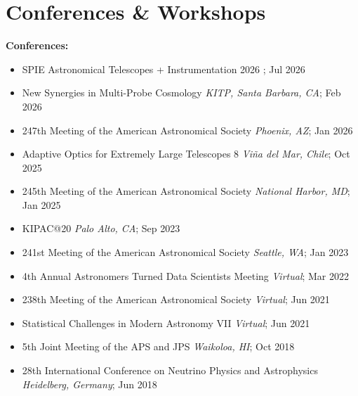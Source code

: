 \section{Conferences \& Workshops}

\textbf{Conferences:}
\begin{itemize}
    \item SPIE Astronomical Telescopes + Instrumentation 2026 \hfill {}; Jul 2026
    \item New Synergies in Multi-Probe Cosmology \hfill \textit{KITP, Santa Barbara, CA}; Feb 2026
    \item 247th Meeting of the American Astronomical Society \hfill \textit{Phoenix, AZ}; Jan 2026
    \item Adaptive Optics for Extremely Large Telescopes 8 \hfill \textit{Vi\~{n}a del Mar, Chile}; Oct 2025
    \item 245th Meeting of the American Astronomical Society \hfill \textit{National Harbor, MD}; Jan 2025
    \item KIPAC@20 \hfill \textit{Palo Alto, CA}; Sep 2023
    \item 241st Meeting of the American Astronomical Society \hfill \textit{Seattle, WA}; Jan 2023
    \item 4th Annual Astronomers Turned Data Scientists Meeting \hfill \textit{Virtual}; Mar 2022
    \item 238th Meeting of the American Astronomical Society \hfill \textit{Virtual}; Jun 2021
    \item Statistical Challenges in Modern Astronomy VII \hfill \textit{Virtual}; Jun 2021
    \item 5th Joint Meeting of the APS and JPS \hfill \textit{Waikoloa, HI}; Oct 2018
    \item 28th International Conference on Neutrino Physics and Astrophysics \hfill \textit{Heidelberg, Germany}; Jun 2018
\end{itemize}

